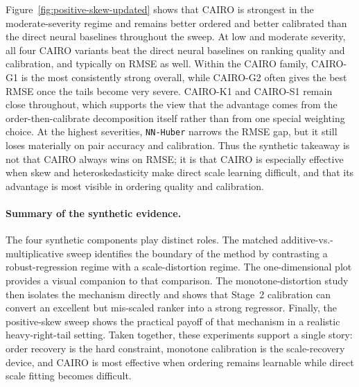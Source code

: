 Figure~\ref{fig:positive-skew-updated} shows that \textsc{CAIRO} is strongest in the moderate-severity regime and remains better ordered and better calibrated than the direct neural baselines throughout the sweep. At low and moderate severity, all four \textsc{CAIRO} variants beat the direct neural baselines on ranking quality and calibration, and typically on RMSE as well. Within the \textsc{CAIRO} family, \textsc{CAIRO-G1} is the most consistently strong overall, while \textsc{CAIRO-G2} often gives the best RMSE once the tails become very severe. \textsc{CAIRO-K1} and \textsc{CAIRO-S1} remain close throughout, which supports the view that the advantage comes from the order-then-calibrate decomposition itself rather than from one special weighting choice. At the highest severities, \texttt{NN-Huber} narrows the RMSE gap, but it still loses materially on pair accuracy and calibration. Thus the synthetic takeaway is not that \textsc{CAIRO} always wins on RMSE; it is that \textsc{CAIRO} is especially effective when skew and heteroskedasticity make direct scale learning difficult, and that its advantage is most visible in ordering quality and calibration.

\paragraph{Summary of the synthetic evidence.}
The four synthetic components play distinct roles. The matched additive-vs.-multiplicative sweep identifies the boundary of the method by contrasting a robust-regression regime with a scale-distortion regime. The one-dimensional plot provides a visual companion to that comparison. The monotone-distortion study then isolates the mechanism directly and shows that Stage~2 calibration can convert an excellent but mis-scaled ranker into a strong regressor. Finally, the positive-skew sweep shows the practical payoff of that mechanism in a realistic heavy-right-tail setting. Taken together, these experiments support a single story: order recovery is the hard constraint, monotone calibration is the scale-recovery device, and \textsc{CAIRO} is most effective when ordering remains learnable while direct scale fitting becomes difficult.
